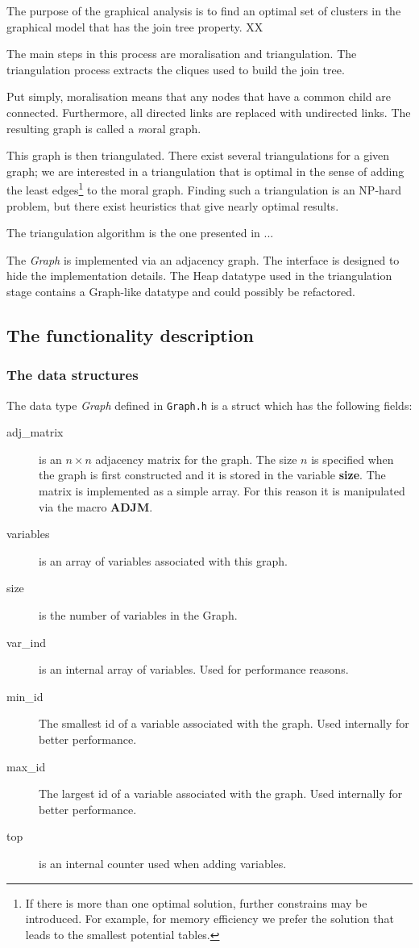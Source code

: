 \documentclass[12pt,a4paper]{report}
\newcommand{\cdatatype}[1]{{\it #1}}
\newcommand{\cfilename}[1]{\verb+#1+}
\newcommand{\cparameter}[1]{\textbf{#1}}
\begin{document}
The purpose of the graphical analysis is to find an optimal set of
clusters in the graphical model that has the join tree property. XX

The main steps in this process are moralisation and triangulation. The
triangulation process extracts the cliques used to build the join tree.
 
Put simply, moralisation means that any nodes that have a common child
are connected. Furthermore, all directed links are replaced with
undirected links. The resulting graph is called a {\textit moral
graph}.

This graph is then triangulated. There exist several triangulations
for a given graph; we are interested in a triangulation that is
optimal in the sense of adding the least edges\footnote{If there is
more than one optimal solution, further constrains may be
introduced. For example, for memory efficiency we prefer the solution
that leads to the smallest potential tables.} to the moral
graph. Finding such a triangulation is an NP-hard problem, but there
exist heuristics that give nearly optimal results.

The triangulation algorithm is the one presented in ... 

The \cdatatype{Graph} is implemented via an adjacency graph. The
interface is designed to hide the implementation details. The Heap
datatype used in the triangulation stage contains a Graph-like
datatype and could possibly be refactored.


\subsection{The functionality description}
\subsubsection{The data structures}
The data type \cdatatype{Graph} defined in \cfilename{Graph.h} is a
struct which has the following fields:
\begin{description}
\item[adj\_matrix] is an $n\times n$ adjacency matrix for the
graph. The size $n$ is specified when the graph is first constructed
and it is stored in the variable \cparameter{size}. The matrix is
implemented as a simple array. For this reason it is manipulated via
the macro \cparameter{ADJM}.
\item[variables] is an array of variables associated with this graph.
\item[size] is the number of variables in the Graph.
\item[var\_ind] is an internal array of variables. Used for
performance reasons.
\item[min\_id] The smallest id of a variable associated with the
graph. Used internally for better performance.
\item[max\_id] The largest id of a variable associated with the
graph. Used internally for better performance.
\item[top] is an internal counter used when adding variables. 
\end{description}
\end{document}
